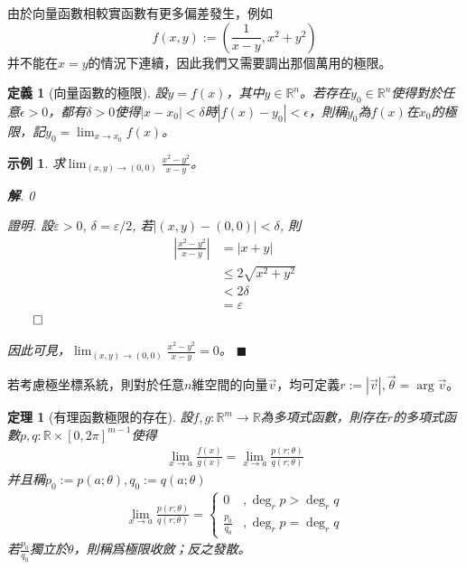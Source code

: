 \documentclass[12pt]{article}
\newtheorem{definition}{定義}
\newtheorem*{theorem}{定理}
\newtheorem*{example}{示例}
\renewenvironment*{proof}{\textit{證明.}}{\hfill$\qed$}
\newenvironment*{sol}{\par \textbf{解}.}{\hfill$\blacksquare$}
\begin{document}
    由於向量函數相較實函數有更多偏差發生，例如$$f(x,y):=(\frac{1}{x-y},x^2+y^2)$$并不能在$x=y$的情況下連續，因此我們又需要調出那個萬用的極限。

    \begin{definition}[向量函數的極限]
        設$y=f(x)$，其中$y\in\mathbb{R}^n$。若存在$y_0\in\mathbb{R}^n$使得對於任意$\epsilon>0$，都有$\delta>0$使得$|x-x_0|<\delta$時$|f(x)-y_0|<\epsilon$，則稱$y_0$為$f(x)$在$x_0$的極限，記$\displaystyle y_0=\lim_{x\to x_0}f(x)$。
    \end{definition}

    \begin{example}
        求$\displaystyle\lim_{(x,y)\to(0,0)}\frac{x^2-y^2}{x-y}$。

        \begin{sol}
            0

            \begin{proof}
                設$\varepsilon>0$, $\delta = \varepsilon/2$, 若$|(x,y)-(0,0)|<\delta$, 則\begin{align*}
                    |\frac{x^2-y^2}{x-y}|&=|x+y|\\
                    &\leq 2\sqrt{x^2+y^2}\\
                    &<2\delta\\
                    &=\varepsilon
                \end{align*}
            \end{proof}

            因此可見，$\displaystyle\lim_{(x,y)\to(0,0)}\frac{x^2-y^2}{x-y}=0$。
        \end{sol}

    \end{example}

    若考慮極坐標系統，則對於任意$n$維空間的向量$\vec{v}$，均可定義$r:=|\vec{v}|,\vec{\theta}=\arg{\vec{v}}$。

    \begin{theorem}[有理函數極限的存在]
        設$f,g:\mathbb{R}^m\to\mathbb{R}$為多項式函數，則存在$r$的多項式函數$p,q:\mathbb{R}\times [0,2\pi]^{m-1}$使得\begin{align*}
            \lim_{x\to a}\frac{f(x)}{g(x)}=\lim_{x\to a}\frac{p(r;\theta)}{q(r;\theta)}
        \end{align*}
        并且稱$p_0:=p(a;\theta),q_0:=q(a;\theta)$\begin{align*}
            \lim_{x\to a}\frac{p(r;\theta)}{q(r;\theta)}=\begin{cases}
                0&,\deg_r{p}>\deg_r{q}\\
                \frac{p_0}{q_0}&,\deg_r{p}=\deg_r{q}
            \end{cases}
        \end{align*}
        若$\frac{p_0}{q_0}$獨立於$\theta$，則稱爲極限收斂；反之發散。
    \end{theorem}
\end{document}
